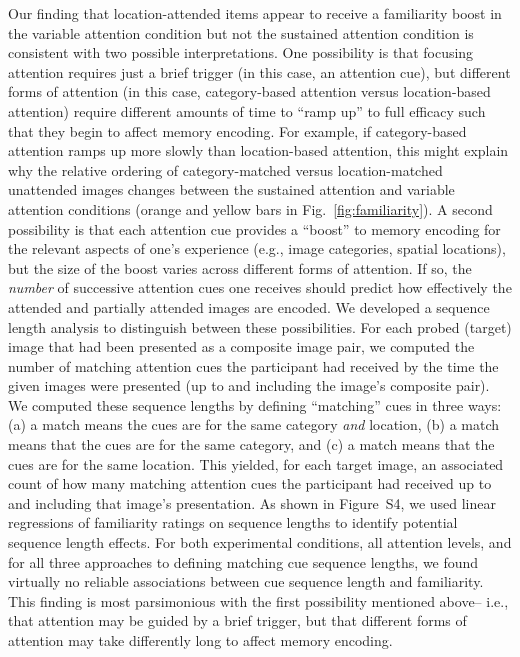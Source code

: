 \documentclass[english]{article}
\newcommand{\sequenceLength}{S4}
\begin{document}
Our finding that location-attended items appear to receive a familiarity boost
in the variable attention condition but not the sustained attention condition
is consistent with two possible interpretations. One possibility is that
focusing attention requires just a brief trigger (in this case, an attention
cue), but different forms of attention (in this case, category-based attention
versus location-based attention) require different amounts of time to ``ramp
up'' to full efficacy such that they begin to affect memory encoding. For
example, if category-based attention ramps up more slowly than location-based
attention, this might explain why the relative ordering of category-matched
versus location-matched unattended images changes between the sustained
attention and variable attention conditions (orange and yellow bars in
Fig.~\ref{fig:familiarity}). A second possibility is that each attention cue
provides a ``boost'' to memory encoding for the relevant aspects of one's
experience (e.g., image categories, spatial locations), but the size of the
boost varies across different forms of attention. If so, the \textit{number} of
successive attention cues one receives should predict how effectively the
attended and partially attended images are encoded. We developed a sequence
length analysis to distinguish between these possibilities. For each probed
(target) image that had been presented as a composite image pair, we computed
the number of matching attention cues the participant had received by the time
the given images were presented (up to and including the image's composite
pair). We computed these sequence lengths by defining ``matching'' cues in
three ways: (a) a match means the cues are for the same category \textit{and}
location, (b) a match means that the cues are for the same category, and (c) a
match means that the cues are for the same location. This yielded, for each
target image, an associated count of how many matching attention cues the
participant had received up to and including that image's presentation. As
shown in Figure~\sequenceLength, we used linear regressions of familiarity
ratings on sequence lengths to identify potential sequence length effects. For
both experimental conditions, all attention levels, and for all three
approaches to defining matching cue sequence lengths, we found virtually no
reliable associations between cue sequence length and familiarity. This finding
is most parsimonious with the first possibility mentioned above-- i.e., that
attention may be guided by a brief trigger, but that different forms of
attention may take differently long to affect memory encoding.
\end{document}
